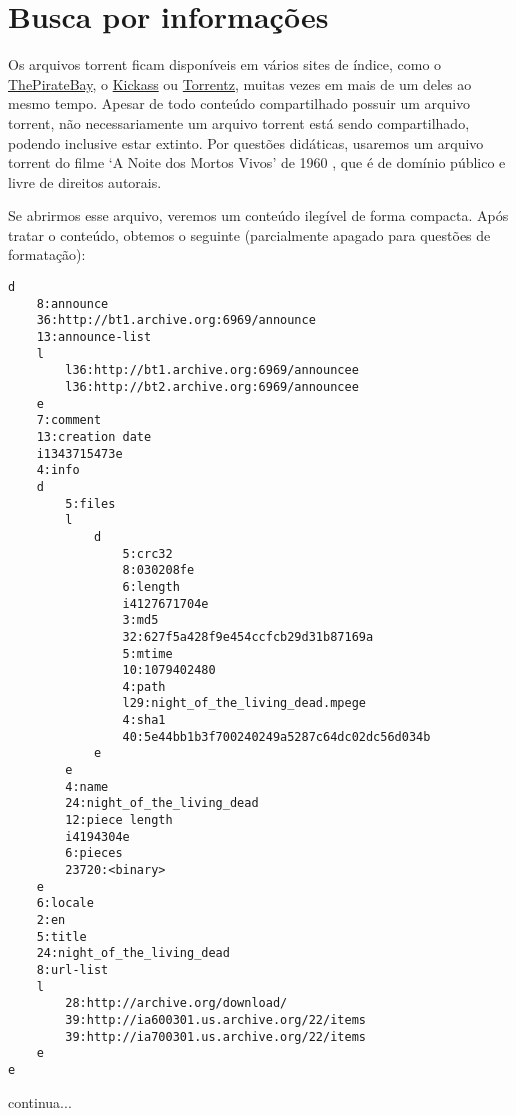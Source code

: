 \section{Busca por informações}

Os arquivos \gls*{torrent} ficam disponíveis em vários sites de índice, como o
\href{http://thepiratebay.sx/}{ThePirateBay}, o \href{http://kickass.to/}{Kickass} ou
\href{https://torrentz.eu/}{Torrentz}, muitas vezes em mais de um deles ao mesmo tempo.
Apesar de todo conteúdo compartilhado possuir um arquivo \gls*{torrent}, não
necessariamente um arquivo \gls*{torrent} está sendo compartilhado, podendo inclusive
estar extinto. Por questões didáticas, usaremos um arquivo torrent do filme `A Noite
dos Mortos Vivos' de 1960 \cite{torrent-file}, que é de domínio público e livre de
direitos autorais.

Se abrirmos esse arquivo, veremos um conteúdo ilegível de forma compacta. Após tratar o
conteúdo, obtemos o seguinte (parcialmente apagado para questões de formatação):

\begin{verbatim}
d
    8:announce
    36:http://bt1.archive.org:6969/announce
    13:announce-list
    l
        l36:http://bt1.archive.org:6969/announcee
        l36:http://bt2.archive.org:6969/announcee
    e
    7:comment
    13:creation date
    i1343715473e
    4:info
    d
        5:files
        l
            d
                5:crc32
                8:030208fe
                6:length
                i4127671704e
                3:md5
                32:627f5a428f9e454ccfcb29d31b87169a
                5:mtime
                10:1079402480
                4:path
                l29:night_of_the_living_dead.mpege
                4:sha1
                40:5e44bb1b3f700240249a5287c64dc02dc56d034b
            e
        e
        4:name
        24:night_of_the_living_dead
        12:piece length
        i4194304e
        6:pieces
        23720:<binary>
    e
    6:locale
    2:en
    5:title
    24:night_of_the_living_dead
    8:url-list
    l
        28:http://archive.org/download/
        39:http://ia600301.us.archive.org/22/items
        39:http://ia700301.us.archive.org/22/items
    e
e
\end{verbatim}

continua...


